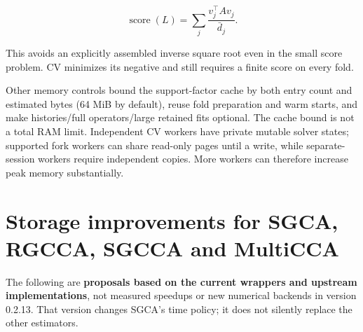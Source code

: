 \documentclass[
  11pt,
]{article}
\begin{document}
\[
\operatorname{score}(L)=\sum_j\frac{v_j^\top Av_j}{\bar d_j}.
\]

This avoids an explicitly assembled inverse square root even in the
small score problem. CV minimizes its negative and still requires a
finite score on every fold.

Other memory controls bound the support-factor cache by both entry count
and estimated bytes (64 MiB by default), reuse fold preparation and warm
starts, and make histories/full operators/large retained fits optional.
The cache bound is not a total RAM limit. Independent CV workers have
private mutable solver states; supported fork workers can share
read-only pages until a write, while separate-session workers require
independent copies. More workers can therefore increase peak memory
substantially.

\hypertarget{storage-improvements-for-sgca-rgcca-sgcca-and-multicca}{%
\section{Storage improvements for SGCA, RGCCA, SGCCA and
MultiCCA}\label{storage-improvements-for-sgca-rgcca-sgcca-and-multicca}}

The following are \textbf{proposals based on the current wrappers and
upstream implementations}, not measured speedups or new numerical
backends in version 0.2.13. That version changes SGCA's time policy; it
does not silently replace the other estimators.
\end{document}
